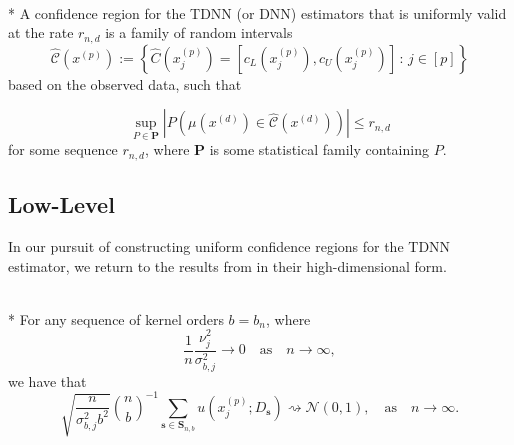 \begin{boxD}
	\begin{dfn}\mbox{}\\*
		A confidence region for the TDNN (or DNN) estimators that is uniformly valid at the rate $r_{n,d}$ is a family of random intervals
		\begin{equation}
			\hat{\mathcal{C}}\left(x^{(p)}\right)
			:= \left\{\hat{C}(x^{(p)}_{j})
			= \left[c_{L}(x^{(p)}_{j}), c_{U}(x^{(p)}_{j})\right]\, : \, j \in [p]\right\}
		\end{equation}
		based on the observed data, such that
	
		\begin{equation}
			\sup_{P \in \mathbf{P}} \left| P\left(\mu(x^{(d)}) \in \hat{\mathcal{C}}\left(x^{(d)}\right)\right) \right| \leq r_{n,d}
		\end{equation}
		for some sequence $r_{n,d}$, where $\mathbf{P}$ is some statistical family containing $P$.
	\end{dfn}
\end{boxD}

\subsection{Low-Level}
In our pursuit of constructing uniform confidence regions for the TDNN estimator, we return to the results from \citet{ritzwoller_simultaneous_2024} in their high-dimensional form.

\begin{boxD}
	\begin{thm}\label{thm:rit4_1}\mbox{}\\*
		For any sequence of kernel orders $b=b_n$, where
		\begin{equation}
			\frac{1}{n} \frac{\nu_j^2}{\sigma_{b, j}^2} \rightarrow 0
			\quad \text{as} \quad
			n \rightarrow \infty,
		\end{equation}
		we have that
		\begin{equation}
			\sqrt{\frac{n}{\sigma_{b, j}^2 b^2}} \binom{n}{b}^{-1} \sum_{\mathbf{s} \in \mathbf{S}_{n, b}} u\left(x^{(p)}_{j} ; D_{\mathbf{s}}\right) \rightsquigarrow \mathcal{N}(0,1),
			\quad \text{as} \quad
			n \rightarrow \infty.
		\end{equation}
	\end{thm}
\end{boxD}

